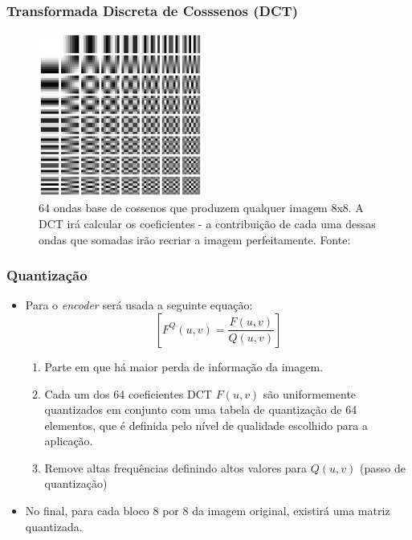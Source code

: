 \documentclass{beamer}
\begin{document}
\begin{frame}
\frametitle{Transformada Discreta de Cosssenos (DCT)}
\begin{figure}
\includegraphics[width=0.48\textwidth]{figs/DCT-8x8.png}
\caption{64 ondas base de cossenos que produzem qualquer imagem 8x8. A DCT irá calcular os coeficientes - a contribuição de cada uma dessas ondas que somadas irão recriar a imagem perfeitamente. Fonte:~\cite{dct}}
\end{figure}
\end{frame}
\newcommand\round[1]{\left[#1\right]}
\begin{frame}
\frametitle{Quantização}
\begin{itemize}
\item Para o \textit{encoder} será usada a seguinte equação:
\begin{equation}\round{F^Q(u,v) = \dfrac{F(u,v)}{Q(u,v)}}\end{equation}
\begin{enumerate}
\item Parte em que há maior perda de informação da imagem.
\item Cada um dos 64 coeficientes DCT $F(u,v)$ são uniformemente quantizados em conjunto com uma tabela de quantização de 64 elementos, que é definida pelo nível de qualidade escolhido para a aplicação.
\item Remove altas frequências definindo altos valores para $Q(u,v)$ (passo de quantização)
\end{enumerate}
\item No final, para cada bloco 8 por 8 da imagem original, existirá uma matriz quantizada.
\end{itemize}
\end{frame}
\end{document}
